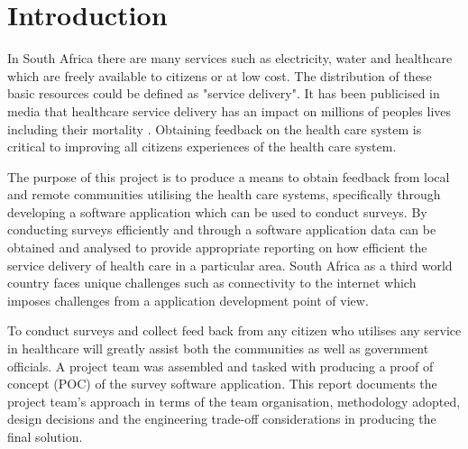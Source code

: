 \documentclass[12pt]{witseiepaper}
\begin{document}


\pagestyle{plain}


\tableofcontents

\newpage
\listoffigures %
\newpage
\listoftables %
\newpage
\renewcommand\thesection{\arabic{section}}
\renewcommand\thesubsection{\thesection.\arabic{subsection}}
 \setcounter{section}{0}
\setcounter{page}{1}
%
\section{Introduction}

In South Africa there are many services such as electricity, water and healthcare which are freely available to citizens or at low cost. The distribution of these basic resources could be defined as "service delivery". It has been publicised in media that healthcare service delivery has an impact on millions of peoples lives including their mortality \cite{InfantsDie}. Obtaining feedback on the health care system is critical to improving all citizens experiences of the health care system.

The purpose of this project is to produce a means to obtain feedback from local and remote communities utilising the health care systems, specifically through developing a software application which can be used to conduct surveys. By conducting surveys efficiently and through a software application data can be obtained and analysed to provide appropriate reporting on how efficient the service delivery of health care in a particular area. South Africa as a third world country faces unique challenges such as connectivity to the internet \cite{Internet} which imposes challenges from a application development point of view. 

To conduct surveys and collect feed back from any citizen who utilises any service in healthcare will greatly assist both the communities as well as government officials. A project team was assembled and tasked with producing a proof of concept (POC) of the survey software application. This report documents the project team's approach in terms of the team organisation, methodology adopted, design decisions and the engineering trade-off considerations in producing the final solution.
\end{document}
